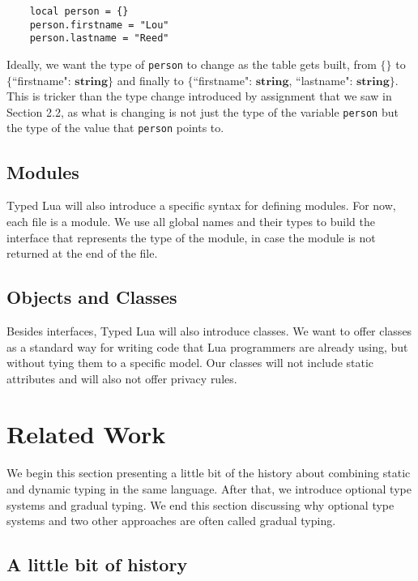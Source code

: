 \documentclass[preprint]{sig-alternate}
\newcommand{\String}{\mathbf{string}}
\begin{document}
\begin{verbatim}
    local person = {}
    person.firstname = "Lou"
    person.lastname = "Reed"
\end{verbatim}

Ideally, we want the type of {\tt person} to change as the
table gets built, from $\{\}$ to $\{$``firstname": $\String\}$
and finally to $\{$``firstname": $\String$, ``lastname":
 $\String\}$. This is tricker than the type change introduced
by assignment that we saw in Section 2.2, as what is changing
is not just the type of the variable {\tt person} but the
type of the value that {\tt person} points to.

\subsection{Modules}

Typed Lua will also introduce a specific syntax for defining modules.
For now, each file is a module.
We use all global names and their types to build the interface that
represents the type of the module, in case the module is not returned
at the end of the file.

\subsection{Objects and Classes}

Besides interfaces, Typed Lua will also introduce classes.
We want to offer classes as a standard way for writing code that
Lua programmers are already using, but without tying them to a
specific model.
Our classes will not include static attributes and will also not offer
privacy rules.


\section{Related Work}
 \label{sec:review}

We begin this section presenting a little bit of the history about
combining static and dynamic typing in the same language.
After that, we introduce optional type systems and gradual typing.
We end this section discussing why optional type systems and two
other approaches are often called gradual typing.

\subsection{A little bit of history}
\end{document}
